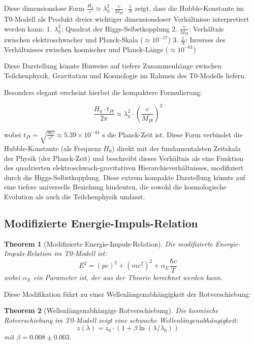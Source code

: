 \documentclass[a4paper,12pt]{article}
\newtheorem{theorem}{Theorem}[section]
\theoremstyle{definition}
\theoremstyle{remark}
\begin{document}
	Diese dimensionslose Form $\frac{H_0}{c} \approx \lambda_h^2 \cdot \frac{v}{M_{Pl}} \cdot \frac{1}{N}$ zeigt, dass die Hubble-Konstante im T0-Modell als Produkt dreier wichtiger dimensionsloser Verhältnisse interpretiert werden kann:
	1. $\lambda_h^2$: Quadrat der Higgs-Selbstkopplung
	2. $\frac{v}{M_{Pl}}$: Verhältnis zwischen elektroschwacher und Planck-Skala ($\approx 10^{-17}$)
	3. $\frac{1}{N}$: Inverses des Verhältnisses zwischen kosmischer und Planck-Länge ($\approx 10^{-61}$)
	
	Diese Darstellung könnte Hinweise auf tiefere Zusammenhänge zwischen Teilchenphysik, Gravitation und Kosmologie im Rahmen des T0-Modells liefern.
	
	Besonders elegant erscheint hierbei die kompaktere Formulierung:
	
	\begin{equation}
		\frac{H_0 \cdot t_{Pl}}{2\pi} \approx \lambda_h^2 \cdot \left(\frac{v}{M_{Pl}}\right)^2
	\end{equation}
	
	wobei $t_{Pl} = \sqrt{\frac{\hbar G}{c^5}} \approx 5.39 \times 10^{-44} \text{ s}$ die Planck-Zeit ist. Diese Form verbindet die Hubble-Konstante (als Frequenz $H_0$) direkt mit der fundamentalsten Zeitskala der Physik (der Planck-Zeit) und beschreibt dieses Verhältnis als eine Funktion des quadrierten elektroschwach-gravitativen Hierarchieverhältnisses, modifiziert durch die Higgs-Selbstkopplung. Diese extrem kompakte Darstellung könnte auf eine tiefere universelle Beziehung hindeuten, die sowohl die kosmologische Evolution als auch die Teilchenphysik umfasst.
	
	\subsection{Modifizierte Energie-Impuls-Relation}
	
	\begin{theorem}[Modifizierte Energie-Impuls-Relation]
		Die modifizierte Energie-Impuls-Relation im T0-Modell ist:
		\begin{equation}
			E^2 = (pc)^2 + (mc^2)^2 + \alpha_E\frac{\hbar c}{T}
		\end{equation}
		wobei $\alpha_E$ ein Parameter ist, der aus der Theorie berechnet werden kann.
	\end{theorem}
	
	Diese Modifikation führt zu einer Wellenlängenabhängigkeit der Rotverschiebung:
	
	\begin{theorem}[Wellenlängenabhängige Rotverschiebung]
		Die kosmische Rotverschiebung im T0-Modell zeigt eine schwache Wellenlängenabhängigkeit:
		\begin{equation}
			z(\lambda) = z_0 \cdot (1 + \beta\ln(\lambda/\lambda_0))
		\end{equation}
		mit $\beta = 0.008 \pm 0.003$.
	\end{theorem}
	
\end{document}
